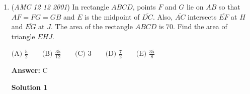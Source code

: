 \begin{enumerate}
 \textbf{Answer: }D



\textbf{Solution}

Using Simon's Favorite Factoring Trick, we can rewrite the three equations as follows:

 
 \begin{align*} (a+1)(b+1) & = 525 \\  (b+1)(c+1) & = 147 \\  (c+1)(d+1) & = 105 \end{align*}


 Let $(e,f,g,h)=(a+1,b+1,c+1,d+1)$. We get:

 
 \begin{align*} ef & = 3\cdot 5\cdot 5\cdot 7 \\  fg & = 3\cdot 7\cdot 7 \\  gh & = 3\cdot 5\cdot 7 \end{align*}


 Clearly $7^2$ divides $fg$. On the other hand, $7^2$ can not divide $f$, as it then would divide $ef$. Similarly, $7^2$ can not divide $g$. Hence $7$ divides both $f$ and $g$. This leaves us with only two cases: $(f,g)=(7,21)$ and $(f,g)=(21,7)$.

 The first case solves to $(e,f,g,h)=(75,7,21,5)$, which gives us $(a,b,c,d)=(74,6,20,4)$, but then $abcd \not= 8!$. We do not need to multiply, it is enough to note e.g. that the left hand side is not divisible by $7$. (Also, a - d equals $70$ in this case, which is way too large to fit the answer choices.)

 The second case solves to $(e,f,g,h)=(25,21,7,15)$, which gives us a valid quadruple $(a,b,c,d)=(24,20,6,14)$, and we have $a-d=24-14 =\boxed{10}$.

 


	\item (\textit{AMC 12 12 2001}) In rectangle $ABCD$, points $F$ and $G$ lie on $AB$ so that $AF=FG=GB$ and $E$ is the midpoint of $\overline{DC}$. Also, $\overline{AC}$ intersects $\overline{EF}$ at $H$ and $\overline{EG}$ at $J$. The area of the rectangle $ABCD$ is $70$. Find the area of triangle $EHJ$.


 $\text{(A) }\frac {5}{2} \qquad \text{(B) }\frac {35}{12} \qquad \text{(C) }3 \qquad \text{(D) }\frac {7}{2} \qquad \text{(E) }\frac {35}{8}$

 \textbf{Answer: }C



\textbf{Solution 1}



\end{enumerate}
